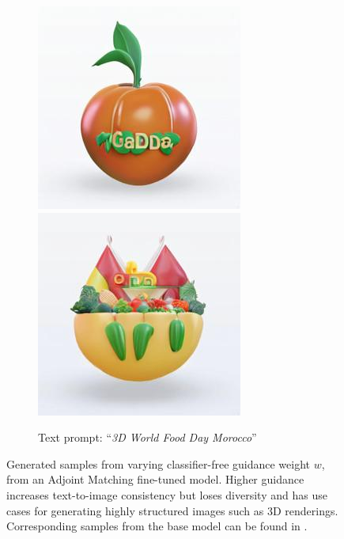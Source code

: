 \documentclass[]{fairmeta}
\begin{document}
\begin{figure}[t!]
\begin{subfigure}[t]{0.49\linewidth}
        \includegraphics[width=0.24\linewidth]{figs/samples/adjmat4.0_prompt_74_image_8.jpg}\,%
        \includegraphics[width=0.24\linewidth]{figs/samples/adjmat4.0_prompt_74_image_9.jpg}
        \caption*{Text prompt: ``\textit{3D World Food Day Morocco}''}
    \end{subfigure}
    \caption{
    Generated samples from varying classifier-free guidance weight $w$, from an Adjoint Matching fine-tuned model. 
    Higher guidance increases text-to-image consistency but loses diversity and has use cases for generating highly structured images such as 3D renderings.
    Corresponding samples from the base model can be found in . 
    }
    \label{fig:ablation_tradeoff_cfg}
\end{figure}
\end{document}
